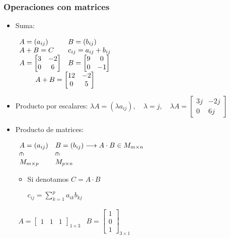 \subsubsection{Operaciones con matrices}
\begin{itemize}[label=\color{lightblue}\textbullet, leftmargin=*]
	\item Suma: 
	
	$\begin{array}{ll}
		A=(a_{ij}) & B=(b_{ij})\\
		A+B=C & c_{ij}=a_{ij}+b_{ij}\\
		A=\begin{bmatrix}
			3 & -2\\
			0 & 6
		\end{bmatrix} & B=\begin{bmatrix}
		9 & 0\\
		0 & -1
		\end{bmatrix}\\	
		\multicolumn{2}{c}{A+B=\begin{bmatrix}
				12 & -2\\
				0 & 5
		\end{bmatrix}} 
	\end{array}$

	\item Producto por escalares:  $\lambda A=(\lambda a_{ij}),\quad\lambda=j,\quad\lambda A=\begin{bmatrix}
	3j & -2j\\
	0 & 6j
	\end{bmatrix}$
	\item Producto de matrices:
	
		$\begin{array}{ll}
		A=(a_{ij}) & B=(b_{ij})\longrightarrow A\cdot B\in M_{m\times n}\\
		\rotatebox[origin=c]{-90}{$\in$} & \rotatebox[origin=c]{-90}{$\in$}\\
		M_{m\times p} & M_{p\times n}
	\end{array}$
	\begin{itemize}
		\item Si denotamos $C=A\cdot B$
		
		$c_{ij}=\sum_{k=1}^{p}a_{ik}b_{kj}$
	\end{itemize}
	\Ej
	
	$\begin{array}{ll}
		A=\begin{bmatrix}
			1 & 1 & 1
		\end{bmatrix}_{1\times 3} & B=\begin{bmatrix}
		1\\
		0\\
		1
		\end{bmatrix}_{3\times1}
	\end{array}$
	

\end{itemize}
